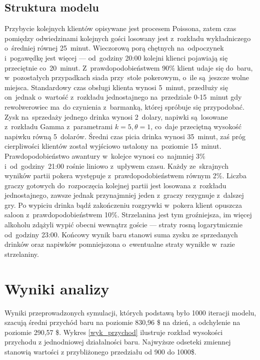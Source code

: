 \documentclass[12pt, a4paper, oneside]{mwart} %
\begin{document}
\subsection{Struktura modelu}
Przybycie kolejnych klientów opisywane jest procesem Poissona, zatem czas pomiędzy odwiedzinami kolejnych gości losowany jest z~rozkładu wykładniczego o~średniej równej 25~minut. Wieczorową porą chętnych na~odpoczynek i~pogawędkę jest więcej --- od~godziny 20:00 kolejni klienci pojawiają się przeciętnie co~20~minut. Z~prawdopodobieństwem 90\% klient udaje się do~baru, w~pozostałych przypadkach siada przy~stole pokerowym, o~ile są~jeszcze wolne miejsca. Standardowy czas obsługi klienta wynosi 5~minut, przedłuży się on~jednak o~wartość z~rozkładu jednostajnego na~przedziale 0-15~minut gdy rewolwerowiec ma~do czynienia z~barmanką, której spróbuje się przypodobać. Zysk na~sprzedaży jednego drinka wynosi 2~dolary, napiwki są~losowane z~rozkładu Gamma z~parametrami $k = 5, \theta = 1$, co~daje przeciętną wysokość napiwku równą 5~dolarów. Średni czas picia drinka wynosi 35~minut, zaś próg cierpliwości klientów został wyjściowo ustalony na~poziomie 15~minut. Prawdopodobieństwo awantury w~kolejce wynosi co~najmniej 3\% i~od~godziny~21:00 rośnie liniowo z~upływem czasu. Każdy ze~skrajnych wyników partii pokera występuje z~prawdopodobieństwem równym 2\%. Liczba graczy gotowych do~rozpoczęcia kolejnej partii jest losowana z~rozkładu jednostajnego, zawsze jednak przynajmniej jeden z~graczy rezygnuje z~dalszej gry. Po wypiciu drinka bądź zakończeniu rozgrywki w~pokera klient opuszcza saloon z~prawdopodobieństwem 10\%. Strzelanina jest tym groźniejsza, im więcej alkoholu zdążyli wypić obecni wewnątrz goście --- straty rosną logarytmicznie od~godziny 23:00. Końcowy wynik baru stanowi suma zysku ze sprzedanych drinków oraz napiwków pomniejszona o~ewentualne straty wynikłe w~razie strzelaniny.

\section{Wyniki analizy}
Wyniki przeprowadzonych symulacji, których podstawą było 1000 iteracji modelu, szacują średni przychód baru na poziomie 830,96 \$ na dzień, a odchylenie na poziomie 290,57 \$. Wykres \ref{wyk_przychod} ilustruje rozkład wysokości przychodu z jednodniowej działalności baru. Najwyższe odseteki zmiennej stanowią wartości z przybliżonego przedziału od 900 do 1000\$.
\end{document}
